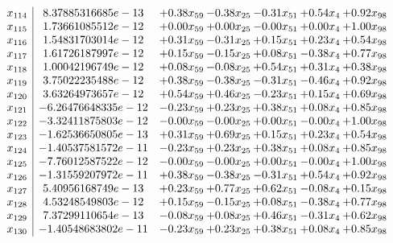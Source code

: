 \documentclass[8pt]{article}
\begin{document}
\[\begin{array}{c| c c@{\hskip 2pt} c@{\hskip 2pt} c@{\hskip 2pt} c@{\hskip 2pt} c@{\hskip 2pt} }
 x_{114}   &  8.37885316685e-13 & +  0.38 x_{59} & -0.38 x_{25} & -0.31 x_{51} & +  0.54 x_{4} & +  0.92 x_{98}\\
 x_{115}   &  1.73661085512e-12 & +  0.00 x_{59} & +  0.00 x_{25} & -0.00 x_{51} & +  0.00 x_{4} & +  1.00 x_{98}\\
 x_{116}   &  1.54831703014e-12 & +  0.31 x_{59} & -0.31 x_{25} & +  0.15 x_{51} & +  0.23 x_{4} & +  0.54 x_{98}\\
 x_{117}   &  1.61726187997e-12 & +  0.15 x_{59} & -0.15 x_{25} & +  0.08 x_{51} & -0.38 x_{4} & +  0.77 x_{98}\\
 x_{118}   &  1.00042196749e-12 & +  0.08 x_{59} & -0.08 x_{25} & +  0.54 x_{51} & +  0.31 x_{4} & +  0.38 x_{98}\\
 x_{119}   &  3.75022235488e-12 & +  0.38 x_{59} & -0.38 x_{25} & -0.31 x_{51} & -0.46 x_{4} & +  0.92 x_{98}\\
 x_{120}   &  3.63264973657e-12 & +  0.54 x_{59} & +  0.46 x_{25} & -0.23 x_{51} & +  0.15 x_{4} & +  0.69 x_{98}\\
 x_{121}   &  -6.26476648335e-12 & -0.23 x_{59} & +  0.23 x_{25} & +  0.38 x_{51} & +  0.08 x_{4} & +  0.85 x_{98}\\
 x_{122}   &  -3.32411875803e-12 & -0.00 x_{59} & -0.00 x_{25} & +  0.00 x_{51} & -0.00 x_{4} & +  1.00 x_{98}\\
 x_{123}   &  -1.62536650805e-13 & +  0.31 x_{59} & +  0.69 x_{25} & +  0.15 x_{51} & +  0.23 x_{4} & +  0.54 x_{98}\\
 x_{124}   &  -1.40537581572e-11 & -0.23 x_{59} & +  0.23 x_{25} & +  0.38 x_{51} & +  0.08 x_{4} & +  0.85 x_{98}\\
 x_{125}   &  -7.76012587522e-12 & -0.00 x_{59} & -0.00 x_{25} & +  0.00 x_{51} & -0.00 x_{4} & +  1.00 x_{98}\\
 x_{126}   &  -1.31559207972e-11 & +  0.38 x_{59} & -0.38 x_{25} & -0.31 x_{51} & +  0.54 x_{4} & +  0.92 x_{98}\\
 x_{127}   &  5.40956168749e-13 & +  0.23 x_{59} & +  0.77 x_{25} & +  0.62 x_{51} & -0.08 x_{4} & +  0.15 x_{98}\\
 x_{128}   &  4.53248549803e-12 & +  0.15 x_{59} & -0.15 x_{25} & +  0.08 x_{51} & -0.38 x_{4} & +  0.77 x_{98}\\
 x_{129}   &  7.37299110654e-13 & -0.08 x_{59} & +  0.08 x_{25} & +  0.46 x_{51} & -0.31 x_{4} & +  0.62 x_{98}\\
 x_{130}   &  -1.40548683802e-11 & -0.23 x_{59} & +  0.23 x_{25} & +  0.38 x_{51} & +  0.08 x_{4} & +  0.85 x_{98}\\

\end{array}\]
\end{document}
